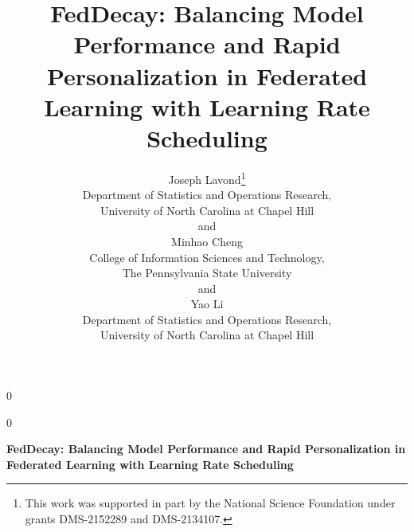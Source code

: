 \documentclass[12pt]{article}
\newcommand{\blind}{0}
\begin{document}
\def\spacingset#1{\renewcommand{\baselinestretch}%
{#1}\small\normalsize} \spacingset{1}



\blind
{
  \title{\bf FedDecay: Balancing Model Performance and Rapid Personalization in Federated Learning with Learning Rate Scheduling}
  \author{
    Joseph Lavond\thanks{This work was supported in part by the National Science Foundation under grants DMS-2152289 and DMS-2134107.}\hspace{.2cm}\\
    Department of Statistics and Operations Research, \\
    University of North Carolina at Chapel Hill \\
    and \\
    Minhao Cheng \\
    College of Information Sciences and Technology, \\
    The Pennsylvania State University \\
    and \\
    Yao Li \\
    Department of Statistics and Operations Research, \\
    University of North Carolina at Chapel Hill \\
    }
  \maketitle
} \fi

\blind
{
  \bigskip
  \bigskip
  \bigskip
  \begin{center}
    {\LARGE\bf FedDecay: Balancing Model Performance and Rapid Personalization in Federated Learning with Learning Rate Scheduling}
\end{center}
  \medskip
} \fi
\end{document}
